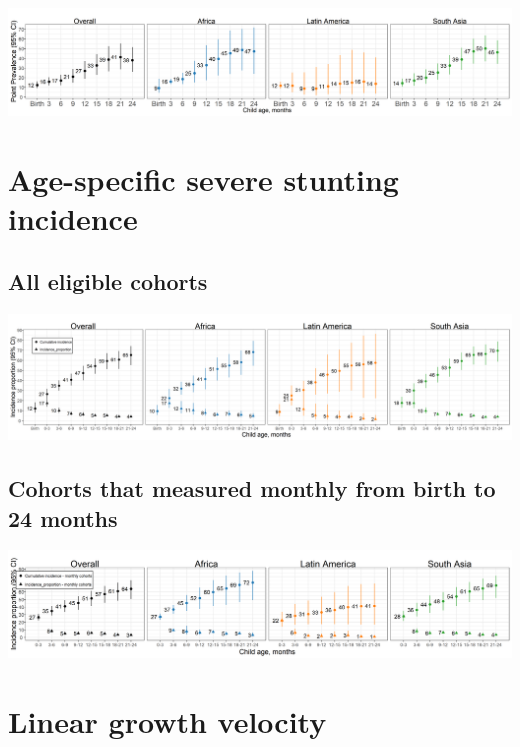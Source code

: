 \documentclass[9pt,]{book}
\begin{document}
\includegraphics[width=58.33in]{figure-copies/fig-stunt-2-prev-overall_region--allage-month24}

\hypertarget{age-specific-severe-stunting-incidence-1}{%
\section{Age-specific severe stunting incidence}\label{age-specific-severe-stunting-incidence-1}}

\hypertarget{all-eligible-cohorts-2}{%
\subsection{All eligible cohorts}\label{all-eligible-cohorts-2}}

\includegraphics[width=66.67in]{figure-copies/fig-stunt-2-inc-overall_region--allage-primary}

\hypertarget{cohorts-that-measured-monthly-from-birth-to-24-months-2}{%
\subsection{Cohorts that measured monthly from birth to 24 months}\label{cohorts-that-measured-monthly-from-birth-to-24-months-2}}

\includegraphics[width=58.33in]{figure-copies/fig-stunt-2-inc-overall_region--allage-month24}

\hypertarget{linear-growth-velocity}{%
\section{Linear growth velocity}\label{linear-growth-velocity}}
\end{document}
